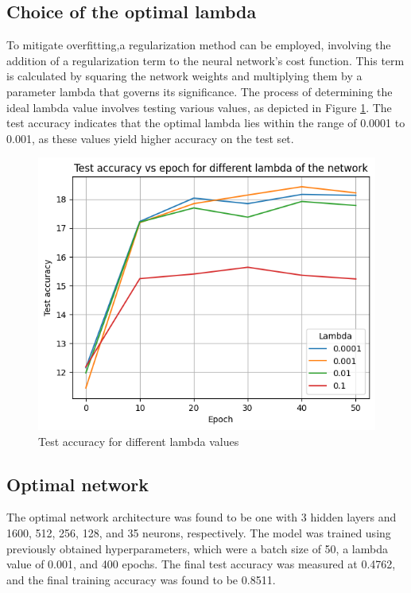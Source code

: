 \documentclass{class}
\begin{document}
\subsection{Choice of the optimal lambda}

To mitigate overfitting,a regularization method can be employed, involving the addition of a regularization term to the neural network's cost function.
This term is calculated by squaring the network weights and multiplying them by a parameter lambda that governs its significance.
The process of determining the ideal lambda value involves testing various values, as depicted in Figure \ref{fig-4}.
The test accuracy indicates that the optimal lambda lies within the range of 0.0001 to 0.001, as these values yield higher accuracy on the test set.
\begin{figure}[H]
  \centering
  \includegraphics[width=.6\columnwidth]{images/lamda.png}
  \caption{Test accuracy for different lambda values}
  \label{fig-4}
\end{figure}

\subsection{Optimal network}
The optimal network architecture was found to be one with 3 hidden layers and 1600, 512, 256, 128, and 35 neurons, respectively.
The model was trained using previously obtained hyperparameters, which were a batch size of 50, a lambda value of 0.001, and 400 epochs.
The final test accuracy was measured at 0.4762, and the final training accuracy was found to be 0.8511.
\end{document}
